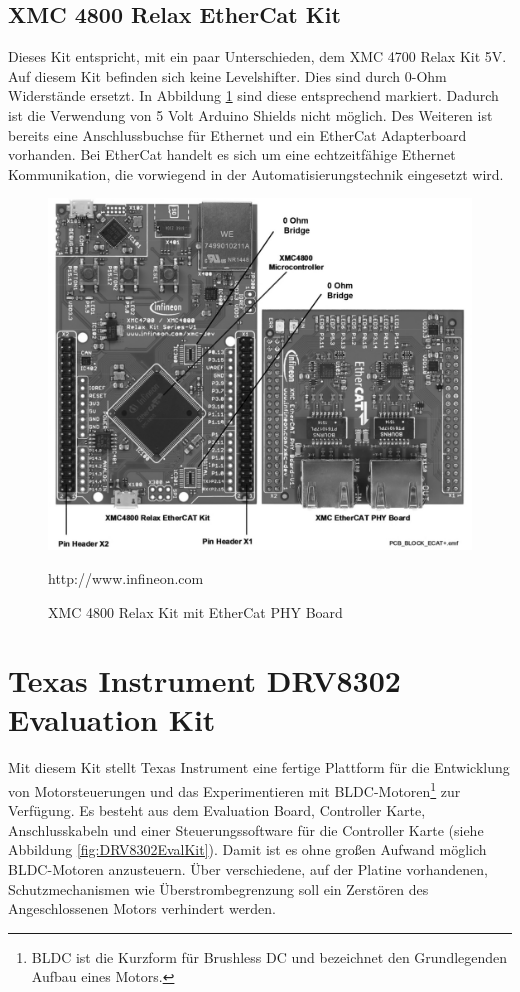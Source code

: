

\subsection{XMC 4800 Relax EtherCat Kit}
\label{sec:XMC4800}
Dieses Kit entspricht, mit ein paar Unterschieden, dem XMC 4700 Relax Kit 5V.
Auf diesem Kit befinden sich keine Levelshifter.
Dies sind durch 0-Ohm Widerstände ersetzt.
In Abbildung \ref{fig:XMC4800} sind diese entsprechend markiert.
Dadurch ist die Verwendung von 5 Volt Arduino Shields nicht möglich.
Des Weiteren ist bereits eine Anschlussbuchse für Ethernet und ein EtherCat Adapterboard vorhanden.
Bei EtherCat handelt es sich um eine echtzeitfähige Ethernet Kommunikation, die vorwiegend in der Automatisierungstechnik eingesetzt wird. 

\begin{figure}[hptb]
	\centering
	\includegraphics[width=\textwidth-4cm]{hardware/graphics/XMC_4800_Board_with_EtherCAT}
	\caption{XMC 4800 Relax Kit mit EtherCat PHY Board}
	\quelle http://www.infineon.com
	\label{fig:XMC4800}
\end{figure}


\newpage
\section{Texas Instrument DRV8302 Evaluation Kit}	
\label{sec:TI DRV8302 EvalKit}
Mit diesem Kit stellt Texas Instrument eine fertige Plattform für die Entwicklung von Motorsteuerungen und das Experimentieren mit BLDC-Motoren\footnote{BLDC ist die Kurzform für Brushless DC und bezeichnet den Grundlegenden Aufbau eines Motors.} zur Verfügung.
Es besteht aus dem Evaluation Board, Controller Karte, Anschlusskabeln und einer Steuerungssoftware für die Controller Karte (siehe Abbildung \ref{fig:DRV8302EvalKit}).
Damit ist es ohne großen Aufwand möglich BLDC-Motoren anzusteuern.
Über verschiedene, auf der Platine vorhandenen, Schutzmechanismen wie Überstrombegrenzung soll ein Zerstören des Angeschlossenen Motors verhindert werden.

